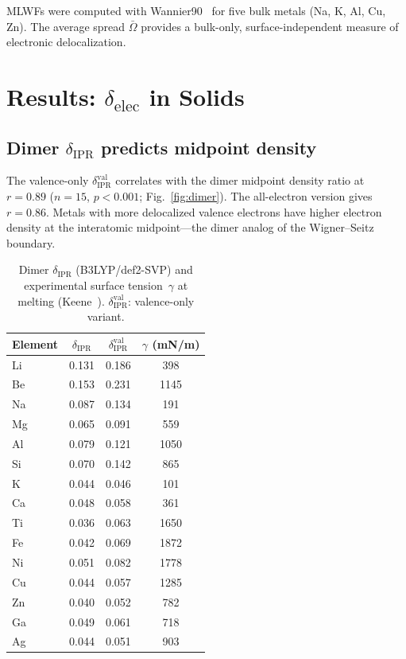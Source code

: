 \documentclass[twocolumn,showpacs,preprintnumbers,amsmath,amssymb,prb]{revtex4-2}
\begin{document}
MLWFs were computed with Wannier90~\cite{Pizzi2020} for
five bulk metals (Na, K, Al, Cu, Zn).
The average spread $\bar{\Omega}$ provides a bulk-only,
surface-independent measure of electronic delocalization.


\section{Results: $\delta_\mathrm{elec}$ in Solids}
\label{sec:results_solid}

\subsection{Dimer $\delta_\mathrm{IPR}$ predicts midpoint density}

The valence-only $\delta_\mathrm{IPR}^\mathrm{val}$ correlates
with the dimer midpoint density ratio at $r = 0.89$
($n = 15$, $p < 0.001$; Fig.~\ref{fig:dimer}).
The all-electron version gives $r = 0.86$.
Metals with more delocalized valence electrons have higher
electron density at the interatomic midpoint---the dimer analog
of the Wigner--Seitz boundary.

\begin{table}[htb]
  \centering
  \caption{Dimer $\delta_\mathrm{IPR}$ (B3LYP/def2-SVP)
    and experimental surface tension~$\gamma$ at melting
    (Keene~\cite{Keene1993}).
    $\delta_\mathrm{IPR}^\mathrm{val}$: valence-only variant.}
  \label{tab:dimer}
  \begin{ruledtabular}
  \begin{tabular}{lccc}
    Element & $\delta_\mathrm{IPR}$ &
      $\delta_\mathrm{IPR}^\mathrm{val}$ &
      $\gamma$ (mN/m) \\
    \hline
    Li  & 0.131 & 0.186 &  398 \\
    Be  & 0.153 & 0.231 & 1145 \\
    Na  & 0.087 & 0.134 &  191 \\
    Mg  & 0.065 & 0.091 &  559 \\
    Al  & 0.079 & 0.121 & 1050 \\
    Si  & 0.070 & 0.142 &  865 \\
    K   & 0.044 & 0.046 &  101 \\
    Ca  & 0.048 & 0.058 &  361 \\
    Ti  & 0.036 & 0.063 & 1650 \\
    Fe  & 0.042 & 0.069 & 1872 \\
    Ni  & 0.051 & 0.082 & 1778 \\
    Cu  & 0.044 & 0.057 & 1285 \\
    Zn  & 0.040 & 0.052 &  782 \\
    Ga  & 0.049 & 0.061 &  718 \\
    Ag  & 0.044 & 0.051 &  903 \\
  \end{tabular}
  \end{ruledtabular}
\end{table}
\end{document}
